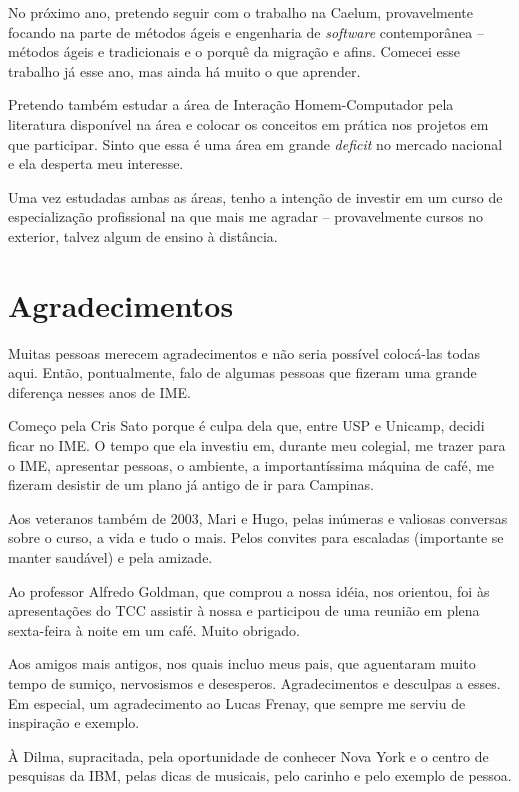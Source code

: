 \documentclass[titlepage,a4paper]{article}
\newcommand{\software}{\textit{software}}
\begin{document}
No próximo ano, pretendo seguir com o trabalho na Caelum, provavelmente focando na parte de métodos ágeis e engenharia de \software{} contemporânea -- métodos ágeis e tradicionais e o porquê da migração e afins. Comecei esse trabalho já esse ano, mas ainda há muito o que aprender.

Pretendo também estudar a área de Interação Homem-Computador pela literatura disponível na área e colocar os conceitos em prática nos projetos em que participar. Sinto que essa é uma área em grande \textit{deficit} no mercado nacional e ela desperta meu interesse.

Uma vez estudadas ambas as áreas, tenho a intenção de investir em um curso de especialização profissional na que mais me agradar -- provavelmente cursos no exterior, talvez algum de ensino à distância.

\section{Agradecimentos}

Muitas pessoas merecem agradecimentos e não seria possível colocá-las todas aqui. Então, pontualmente, falo de algumas pessoas que fizeram uma grande diferença nesses anos de IME. 

Começo pela Cris Sato porque é culpa dela que, entre USP e Unicamp, decidi ficar no IME. O tempo que ela investiu em, durante meu colegial, me trazer para o IME, apresentar pessoas, o ambiente, a importantíssima máquina de café, me fizeram desistir de um plano já antigo de ir para Campinas.

Aos veteranos também de 2003, Mari e Hugo, pelas inúmeras e valiosas conversas sobre o curso, a vida e tudo o mais. Pelos convites para escaladas (importante se manter saudável) e pela amizade.

Ao professor Alfredo Goldman, que comprou a nossa idéia, nos orientou, foi às apresentações do TCC assistir à nossa e participou de uma reunião em plena sexta-feira à noite em um café. Muito obrigado.

Aos amigos mais antigos, nos quais incluo meus pais, que aguentaram muito tempo de sumiço, nervosismos e desesperos. Agradecimentos e desculpas a esses. Em especial, um agradecimento ao Lucas Frenay, que sempre me serviu de inspiração e exemplo.

À Dilma, supracitada, pela oportunidade de conhecer Nova York e o centro de pesquisas da IBM, pelas dicas de musicais, pelo carinho e pelo exemplo de pessoa.
\end{document}
